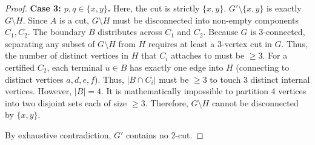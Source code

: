 \documentclass[12pt]{article}
\begin{document}
\begin{proof}
\textbf{Case 3: $p, q \in \{x, y\}$.}
Here, the cut is strictly $\{x, y\}$. $G' \setminus \{x, y\}$ is exactly $G \setminus H$.
Since $A$ is a cut, $G \setminus H$ must be disconnected into non-empty components $C_1, C_2$.
The boundary $B$ distributes across $C_1$ and $C_2$.
Because $G$ is 3-connected, separating any subset of $G \setminus H$ from $H$ requires at least a 3-vertex cut in $G$. Thus, the number of distinct vertices in $H$ that $C_i$ attaches to must be $\ge 3$.
For a certified $C_2$, each terminal $u \in B$ has exactly one edge into $H$ (connecting to distinct vertices $a, d, e, f$). Thus, $|B \cap C_i|$ must be $\ge 3$ to touch 3 distinct internal vertices.
However, $|B| = 4$. It is mathematically impossible to partition 4 vertices into two disjoint sets each of size $\ge 3$. Therefore, $G \setminus H$ cannot be disconnected by $\{x, y\}$.

By exhaustive contradiction, $G'$ contains no 2-cut.
\end{proof}
\end{document}
